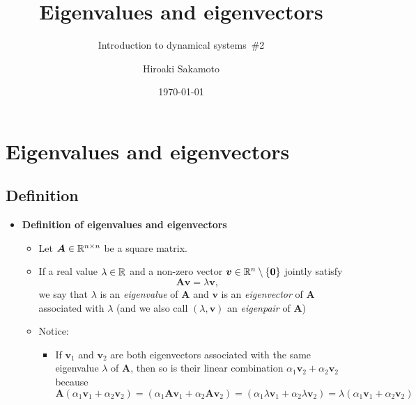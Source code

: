 \documentclass[12pt,a4paper]{article}
\title{Eigenvalues and eigenvectors}
\subtitle{Introduction to dynamical systems~\#2}
\author{Hiroaki Sakamoto}
\date{\today}
\begin{document}
\maketitle
\tableofcontents

\section{Eigenvalues and eigenvectors}

\subsection{Definition}

\begin{itemize}

\item \textbf{Definition of eigenvalues and eigenvectors}
  \begin{itemize}
  \item Let $\bm{A}\in \mathbb{R}^{n\times n}$ be a square matrix.
  \item If a real value $\lambda\in \mathbb{R}$
    and a non-zero vector $\bm{v}\in\mathbb{R}^{n}\setminus\{\bm{0}\}$ jointly satisfy
    \begin{equation}\nonumber%
      \bm{A}\bm{v} = \lambda \bm{v},
    \end{equation}
    we say that $\lambda$ is an \emph{eigenvalue} of $\bm{A}$
    and $\bm{v}$ is an \emph{eigenvector} of $\bm{A}$ associated with $\lambda$
    (and we also call $(\lambda, \bm{v})$ an \emph{eigenpair} of $\bm{A}$)
  \item Notice:
    \begin{itemize}
    \item If $\bm{v}_{1}$ and $\bm{v}_{2}$ are both eigenvectors associated with the same eigenvalue $\lambda$ of $\bm{A}$,
      then so is their linear combination $\alpha_{1}\bm{v}_{2}+ \alpha_{2}\bm{v}_{2}$ because
      \begin{equation}\nonumber%
        \bm{A}\left(\alpha_{1}\bm{v}_{1}+ \alpha_{2}\bm{v}_{2}\right)
        = \left(\alpha_{1}\bm{A}\bm{v}_{1}+ \alpha_{2}\bm{A}\bm{v}_{2}\right)
        = \left(\alpha_{1}\lambda\bm{v}_{1}+ \alpha_{2}\lambda\bm{v}_{2}\right)
        = \lambda \left(\alpha_{1}\bm{v}_{1}+ \alpha_{2}\bm{v}_{2}\right)
      \end{equation}

\end{itemize}
\end{itemize}
\end{itemize}
\end{document}
